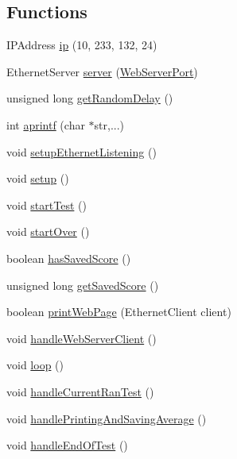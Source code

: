\subsection*{Functions}
\begin{DoxyCompactItemize}
\item 
I\+P\+Address \mbox{\hyperlink{test_8ino_a47343b8b7406f28cf29d8b0285fdd388}{ip}} (10, 233, 132, 24)
\item 
Ethernet\+Server \mbox{\hyperlink{test_8ino_acc33ddf5eb1a701fe7fc54e6c558f76b}{server}} (\mbox{\hyperlink{test_8ino_af37b150d7960fc164e55cf58aade65a3}{Web\+Server\+Port}})
\item 
unsigned long \mbox{\hyperlink{test_8ino_acfe46c2625596d6b059364eae0d9de41}{get\+Random\+Delay}} ()
\item 
int \mbox{\hyperlink{test_8ino_acf86b2821b6508dcc5b16428d63d1dfd}{aprintf}} (char $\ast$str,...)
\item 
void \mbox{\hyperlink{test_8ino_a40fd6d0d758260fb56eda3dcc72a43f0}{setup\+Ethernet\+Listening}} ()
\item 
void \mbox{\hyperlink{test_8ino_a4fc01d736fe50cf5b977f755b675f11d}{setup}} ()
\item 
void \mbox{\hyperlink{test_8ino_a347505306ad1e528ecf6b6f19866b5a5}{start\+Test}} ()
\item 
void \mbox{\hyperlink{test_8ino_a56253a1424a135b174dcc12716a79d75}{start\+Over}} ()
\item 
boolean \mbox{\hyperlink{test_8ino_a832bc26a7873ae480d28907b29880813}{has\+Saved\+Score}} ()
\item 
unsigned long \mbox{\hyperlink{test_8ino_ae10d67159ad951c6d293550eba144547}{get\+Saved\+Score}} ()
\item 
boolean \mbox{\hyperlink{test_8ino_a4bc21f1d5c931a2590a7cd760368cb78}{print\+Web\+Page}} (Ethernet\+Client client)
\item 
void \mbox{\hyperlink{test_8ino_a4240c872c1f2907aac992663ccc5666d}{handle\+Web\+Server\+Client}} ()
\item 
void \mbox{\hyperlink{test_8ino_afe461d27b9c48d5921c00d521181f12f}{loop}} ()
\item 
void \mbox{\hyperlink{test_8ino_a88a2b207186d3402859a88394a1b0a76}{handle\+Current\+Ran\+Test}} ()
\item 
void \mbox{\hyperlink{test_8ino_a6b058d40feb0a038c46ec9e52b9cdc76}{handle\+Printing\+And\+Saving\+Average}} ()
\item 
void \mbox{\hyperlink{test_8ino_a9849dea51c0097aff1bc18f7f089ecc2}{handle\+End\+Of\+Test}} ()

\end{DoxyCompactItemize}

